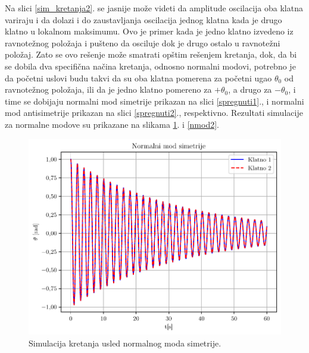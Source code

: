 \documentclass[a4paper, 12pt, diplomski]{etf}
\begin{document}
\noindent
Na slici \ref{sim_kretanja2}. se jasnije može videti da amplitude oscilacija oba klatna variraju i da dolazi i do zaustavljanja oscilacija jednog klatna kada je drugo klatno u lokalnom maksimumu. Ovo je primer kada je jedno klatno izvedeno iz ravnotežnog položaja i pušteno da osciluje dok je drugo ostalo u ravnotežni položaj. Zato se ovo rešenje može smatrati opštim rešenjem kretanja, dok, da bi se dobila dva specifična načina kretanja, odnosno normalni modovi, potrebno je da početni uslovi budu takvi da su oba klatna pomerena za početni ugao $\theta_0$ od ravnotežnog položaja, ili da je jedno klatno pomereno za $+\theta_0$, a drugo za $-\theta_0$, i time se dobijaju normalni mod simetrije prikazan na slici \ref{spregnuti1}., i normalni mod antisimetrije prikazan na slici \ref{spregnuti2}., respektivno. Rezultati simulacije za normalne modove su prikazane na slikama \ref{nmod1}. i \ref{nmod2}.

\begin{figure}[h!]
    \centering
    \includegraphics[scale=0.9]{py_teorija/nmod_simetrija.pdf}
    \caption{Simulacija kretanja usled normalnog moda simetrije.}
    \label{nmod1}
\end{figure}

\break
\end{document}
